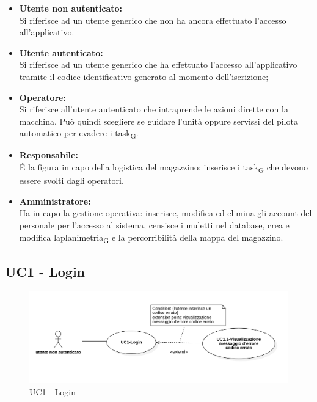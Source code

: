 \begin{itemize}
	\item{\textbf{Utente non autenticato:}\\
	Si riferisce ad un utente generico che non ha ancora effettuato l'accesso all'applicativo.}
	\item{\textbf{Utente autenticato:}\\
	Si riferisce ad un utente generico che ha effettuato l'accesso all'applicativo tramite il codice identificativo generato al momento dell'iscrizione;}
	\item{\textbf{Operatore:}\\
	Si riferisce all'utente autenticato che intraprende le azioni dirette con la macchina. Può quindi scegliere se guidare l'unità oppure servissi del pilota automatico per evadere i task\textsubscript{G}.}
	\item{\textbf{Responsabile:}\\
	 \'E la figura in capo della logistica del magazzino: inserisce i task\textsubscript{G} che devono essere svolti dagli operatori.}
	\item{\textbf{Amministratore:}\\
 Ha in capo la gestione operativa: inserisce, modifica ed elimina gli account del personale per l'accesso al sistema, censisce i muletti nel database, crea e modifica laplanimetria\textsubscript{G} e la percorribilità della mappa del magazzino.}
\end{itemize}

\subsection{UC1 - Login}
\begin{figure}[H]
	\centering
	\includegraphics[scale=0.52]{res/images/uc1.png}
	\caption{UC1 - Login}
\end{figure}


